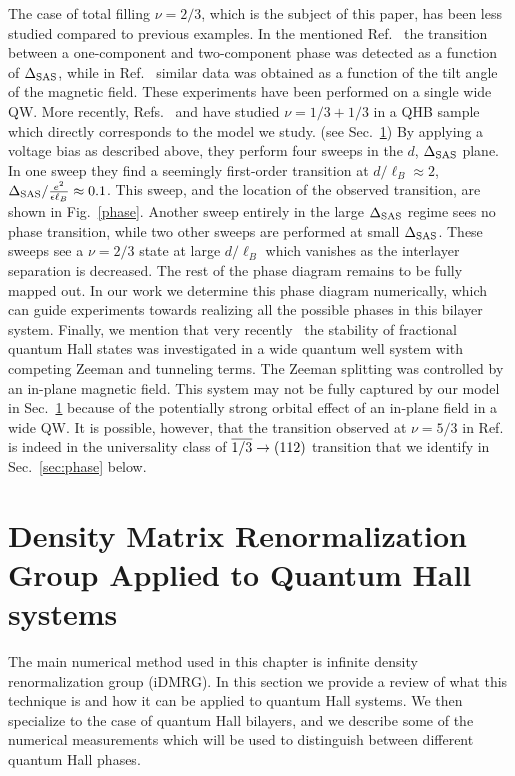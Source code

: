 The case of total filling $\nu=2/3$, which is the subject of this paper, has been less studied compared to previous examples.
In the mentioned Ref.~\cite{Suen94} the transition between a one-component and two-component phase was detected as a function of $\Delta_\textrm{SAS}$, while in Ref.~\cite{Lay97} similar data was obtained as a function of the tilt angle of the magnetic field.
These experiments have been performed on a single wide QW.
More recently, Refs.~\cite{Hirayama2002b} and \cite{Hirayama2004} have studied $\nu=1/3+1/3$ in a QHB sample which directly corresponds to the model we study. (see Sec.~\ref{sec:method})
By applying a voltage bias as described above, they perform four sweeps in the $d$, $\Delta_\textrm{SAS}$ plane. 
In one sweep \cite{Hirayama2002b} they find a seemingly first-order transition at $d/\ell_B\approx2$, $\Delta_\textrm{SAS}/\frac{e^2}{\epsilon\ell_B}\approx0.1$.
This sweep, and the location of the observed transition, are shown in Fig.~\ref{phase}.
Another sweep entirely in the large $\Delta_\textrm{SAS}$ regime sees no phase transition, while two other sweeps are performed at small $\Delta_\textrm{SAS}$.
These sweeps see a $\nu=2/3$ state at large $d/\ell_B$ which vanishes as the interlayer separation is decreased.
The rest of the phase diagram remains to be fully mapped out.
In our work we determine this phase diagram numerically, which can guide experiments towards realizing all the possible phases in this bilayer system.
Finally, we mention that very recently~\cite{Liu15} the stability of fractional quantum Hall states was investigated in a wide quantum well system with competing Zeeman and tunneling terms.
The Zeeman splitting was controlled by an in-plane magnetic field.
This system may not be fully captured by our model in Sec.~\ref{sec:method} because of the potentially strong orbital effect of an in-plane field in a wide QW.
It is possible, however, that the transition observed at $\nu=5/3$ in Ref.~\cite{Liu15} is indeed in the universality class of $\overline{1/3} \to (112)$ transition that we identify in Sec.~\ref{sec:phase} below.  


\section{Density Matrix Renormalization Group Applied to Quantum Hall systems}
\label{sec:method}
The main numerical method used in this chapter is infinite density renormalization group (iDMRG). In this section we provide a review of what this technique is and how it can be applied to quantum Hall systems. We then specialize to the case of quantum Hall bilayers, and we describe some of the numerical measurements which will be used to distinguish between different quantum Hall phases.

